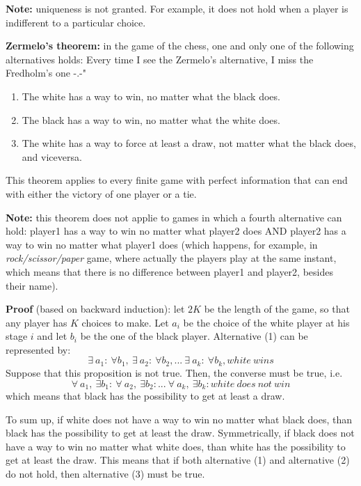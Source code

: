 \noindent \textbf{Note:} uniqueness is not granted. For example, it does not 
hold when a player is indifferent to a particular choice.

\bigskip
\noindent \textbf{Zermelo's theorem:} in the game of the chess, one and only 
one of the following alternatives holds: {\huge Every time I see the Zermelo's 
alternative, I miss the Fredholm's one -.-"}
\begin{enumerate}
	\item The white has a way to win, no matter what the black does.
	\item The black has a way to win, no matter what the white does.
	\item The white has a way to force at least a draw, not matter what the 
	black does, and viceversa.
\end{enumerate}
This theorem applies to every finite game with perfect information 
that can end with either the victory of one player or a tie.

\noindent \textbf{Note:} this theorem does not applie to games in which a 
fourth alternative can hold: player1 has a way to win no matter what player2 
does AND player2 has a way to win no matter what player1 does (which 
happens, for example, in \textit{rock/scissor/paper} game, where actually 
the players play at the same instant, which means that there is no difference 
between player1 and player2, besides their name).

\bigskip
\noindent \textbf{Proof} (based on backward induction): let $2K$ be the length 
of the game, so that any player has $K$ choices to make. Let $a_i$ be the 
choice of the white player at his stage $i$ and let $b_i$ be the one of the 
black player. Alternative (1) can be represented by:
\[
	\exists~a_1: ~\forall b_1, ~\exists~a_2: ~\forall b_2,...
	~\exists~a_k: ~\forall b_k, white~wins
\]
Suppose that this proposition is not true. Then, the converse must be true, 
i.e.
\[
	\forall~a_1, ~\exists b_1: ~\forall~a_2, ~\exists b_2:...
	~\forall~a_k, ~\exists b_k: white~does~not~win
\]
which means that black has the possibility to get at least a draw.

\noindent To sum up, if white does not have a way to win no matter what black 
does, than black has the possibility to get at least the draw. Symmetrically, 
if black does not have a way to win no matter what white does, than white has 
the possibility to get at least the draw. This means that if both alternative 
(1) and alternative (2) do not hold, then alternative (3) must be true.

